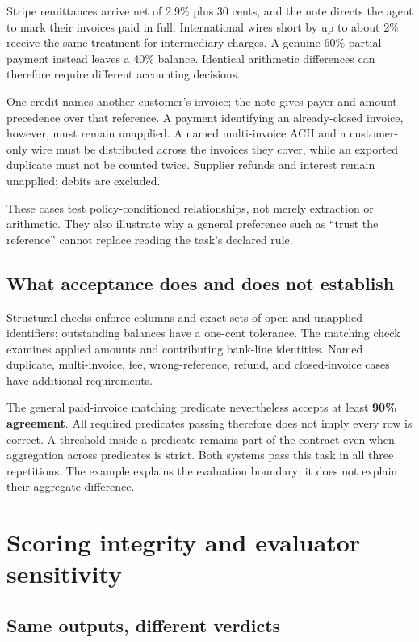 Stripe remittances arrive net of 2.9\% plus 30 cents, and the note directs the agent to mark their invoices paid in full. International wires short by up to about 2\% receive the same treatment for intermediary charges. A genuine 60\% partial payment instead leaves a 40\% balance. Identical arithmetic differences can therefore require different accounting decisions.

One credit names another customer's invoice; the note gives payer and amount precedence over that reference. A payment identifying an already-closed invoice, however, must remain unapplied. A named multi-invoice ACH and a customer-only wire must be distributed across the invoices they cover, while an exported duplicate must not be counted twice. Supplier refunds and interest remain unapplied; debits are excluded.

These cases test policy-conditioned relationships, not merely extraction or arithmetic. They also illustrate why a general preference such as ``trust the reference'' cannot replace reading the task's declared rule.

\subsection{What acceptance does and does not establish}\label{what-acceptance-does-and-does-not-establish}

Structural checks enforce columns and exact sets of open and unapplied identifiers; outstanding balances have a one-cent tolerance. The matching check examines applied amounts and contributing bank-line identities. Named duplicate, multi-invoice, fee, wrong-reference, refund, and closed-invoice cases have additional requirements.

The general paid-invoice matching predicate nevertheless accepts at least \textbf{90\% agreement}. All required predicates passing therefore does not imply every row is correct. A threshold inside a predicate remains part of the contract even when aggregation across predicates is strict. Both systems pass this task in all three repetitions. The example explains the evaluation boundary; it does not explain their aggregate difference.

\section{Scoring integrity and evaluator sensitivity}\label{sec:6}

\subsection{Same outputs, different verdicts}\label{same-outputs-different-verdicts}

